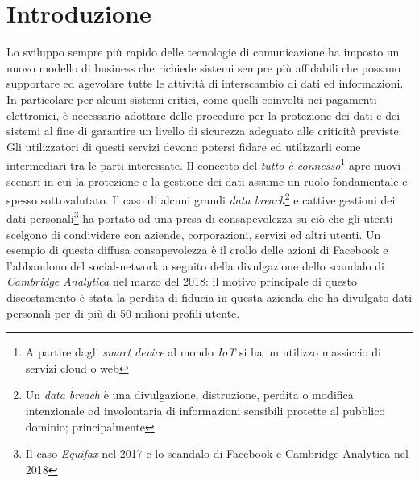 \chapter*{Introduzione}
Lo sviluppo sempre più rapido delle tecnologie di comunicazione ha imposto un nuovo modello di business che richiede sistemi sempre più affidabili che possano supportare ed agevolare tutte le attività di interscambio di dati ed informazioni. In particolare per alcuni sistemi critici, come quelli coinvolti nei pagamenti elettronici, è necessario adottare delle procedure per la protezione dei dati e dei sistemi al fine di garantire un livello di sicurezza adeguato alle criticità previste. Gli utilizzatori di questi servizi devono potersi fidare ed utilizzarli come intermediari tra le parti interessate.\newline\newline
Il concetto del \textit{tutto è connesso}\footnote{A partire dagli \textit{smart device} al mondo \textit{IoT} si ha un utilizzo massiccio di servizi cloud o web} apre nuovi scenari in cui la protezione e la gestione dei dati assume un ruolo fondamentale e spesso sottovalutato. Il caso di alcuni grandi \textit{data breach}\footnote{Un \textit{data breach} è una divulgazione, distruzione, perdita o modifica intenzionale od involontaria di informazioni sensibili protette al pubblico dominio; principalmente } e cattive gestioni dei dati personali\footnote{Il caso \href{https://www.nytimes.com/2017/09/07/business/equifax-cyberattack.html}{\textit{Equifax}} nel 2017 e lo scandalo di \href{https://www.washingtonpost.com/business/understanding-the-facebook-cambridge-analytica-story-quicktake/2018/04/09/0f18d91c-3c1c-11e8-955b-7d2e19b79966_story.html}{Facebook e Cambridge Analytica} nel 2018} ha portato ad una presa di consapevolezza su ciò che gli utenti scelgono di condividere con aziende, corporazioni, servizi ed altri utenti.\newline
Un esempio di questa diffusa consapevolezza è il crollo delle azioni di Facebook e l'abbandono del social-network a seguito della divulgazione dello scandalo di \textit{Cambridge Analytica} nel marzo del 2018: il motivo principale di questo discostamento è stata la perdita di fiducia in questa azienda che ha divulgato dati personali per di più di 50 milioni profili utente.\newline
